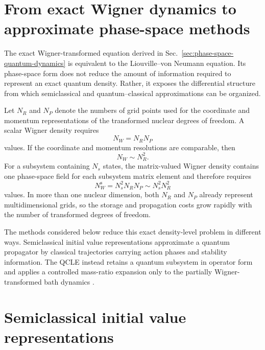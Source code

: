 \documentclass[
  11pt,
  letterpaper,
  onehalfspacing,
  normalmargins,
  equalmargins,
  oneside
]{ut-thesis}
\begin{document}
\section{From exact Wigner dynamics to approximate phase-space methods}
\label{sec:exact-wigner-to-approximate-phase-space}

The exact Wigner-transformed equation derived in
Sec.~\ref{sec:phase-space-quantum-dynamics} is equivalent to the
Liouville--von Neumann equation. Its phase-space form does not reduce the
amount of information required to represent an exact quantum density. Rather,
it exposes the differential structure from which semiclassical and
quantum--classical approximations can be organized.

Let \(N_R\) and \(N_P\) denote the numbers of grid points used for the
coordinate and momentum representations of the transformed nuclear degrees of
freedom. A scalar Wigner density requires
\begin{equation}
N_W=N_RN_P
\label{eq:wigner-grid-size-total}
\end{equation}
values. If the coordinate and momentum resolutions are comparable, then
\begin{equation}
N_W\sim N_R^2.
\label{eq:wigner-grid-size-density-level}
\end{equation}
For a subsystem containing \(N_s\) states, the matrix-valued Wigner density
contains one phase-space field for each subsystem matrix element and therefore
requires
\begin{equation}
N_W^{\mathrm s}=N_s^2N_RN_P
\sim N_s^2N_R^2
\label{eq:matrix-valued-wigner-grid-size}
\end{equation}
values. In more than one nuclear dimension, both \(N_R\) and \(N_P\) already
represent multidimensional grids, so the storage and propagation costs grow
rapidly with the number of transformed degrees of freedom.

The methods considered below reduce this exact density-level problem in
different ways. Semiclassical initial value representations approximate a
quantum propagator by classical trajectories carrying action phases and
stability information. The QCLE instead retains a quantum subsystem in
operator form and applies a controlled mass-ratio expansion only to the
partially Wigner-transformed bath dynamics
\cite{VanVleck1928,HermanKluk1984,Miller2001,KapralCiccotti1999JCP,Kapral2006ARPC}.


\section{Semiclassical initial value representations}
\label{sec:semiclassical-ivr}
\end{document}
